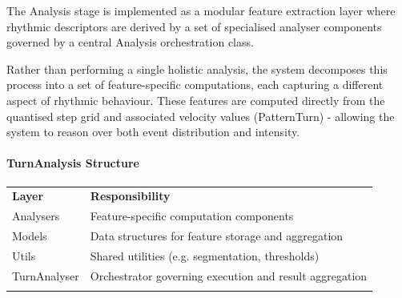The Analysis stage is implemented as a modular feature extraction layer
where rhythmic descriptors are derived by a set of specialised analyser
components governed by a central Analysis orchestration class.

Rather than performing a single holistic analysis, the system decomposes
this process into a set of feature-specific computations, each capturing
a different aspect of rhythmic behaviour. These features are computed
directly from the quantised step grid and associated velocity values
(PatternTurn) - allowing the system to reason over both event
distribution and intensity.

\paragraph{TurnAnalysis Structure}\label{turnanalysis-structure}

{\def\LTcaptype{none} %
\begin{longtable}[]{@{}
  >{\raggedright\arraybackslash}p{}
  >{\raggedright\arraybackslash}p{}@{}}
\toprule\noalign{}
\begin{minipage}[b]{\linewidth}\centering
\textbf{Layer}
\end{minipage} & \begin{minipage}[b]{\linewidth}\centering
\textbf{Responsibility}
\end{minipage} \\
\begin{minipage}[b]{\linewidth}\raggedright
Analysers
\end{minipage} & \begin{minipage}[b]{\linewidth}\raggedright
Feature-specific computation components
\end{minipage} \\
\begin{minipage}[b]{\linewidth}\raggedright
Models
\end{minipage} & \begin{minipage}[b]{\linewidth}\raggedright
Data structures for feature storage and aggregation
\end{minipage} \\
\begin{minipage}[b]{\linewidth}\raggedright
Utils
\end{minipage} & \begin{minipage}[b]{\linewidth}\raggedright
Shared utilities (e.g. segmentation, thresholds)
\end{minipage} \\
\begin{minipage}[b]{\linewidth}\raggedright
TurnAnalyser
\end{minipage} & \begin{minipage}[b]{\linewidth}\raggedright
Orchestrator governing execution and result aggregation
\end{minipage} \\
\midrule\noalign{}
\endhead
\bottomrule\noalign{}
\endlastfoot
\end{longtable}
}

